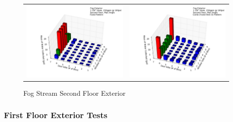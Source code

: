 \documentclass{article}
\begin{document}
\begin{appendices}
\begin{figure}[ht]
\begin{tabular*}{\textwidth}{lr}
\includegraphics[width=3.2in]{../ADD_Analysis/Figures/15-12-07_155751_Datafile_Fog_Exterior.png} &
\includegraphics[width=3.2in]{../ADD_Analysis/Figures/15-12-07_160438_Datafile_Fog_Exterior.png} \\
\end{tabular*}
\caption{Fog Stream Second Floor Exterior}
\label{fig:Fog Stream Second Floor Exterior}
\end{figure}

\clearpage

\subsubsection{First Floor Exterior Tests}


\end{appendices}
\end{document}
